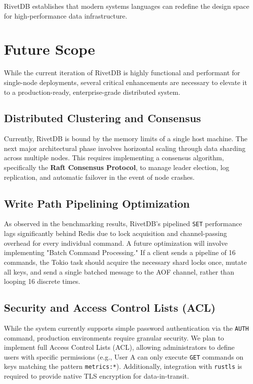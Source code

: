 RivetDB establishes that modern systems languages can redefine the design space for high-performance data infrastructure.

\section{Future Scope}

While the current iteration of RivetDB is highly functional and performant for single-node deployments, several critical enhancements are necessary to elevate it to a production-ready, enterprise-grade distributed system.

\subsection{Distributed Clustering and Consensus}
Currently, RivetDB is bound by the memory limits of a single host machine. The next major architectural phase involves horizontal scaling through data sharding across multiple nodes. This requires implementing a consensus algorithm, specifically the \textbf{Raft Consensus Protocol}, to manage leader election, log replication, and automatic failover in the event of node crashes.

\subsection{Write Path Pipelining Optimization}
As observed in the benchmarking results, RivetDB's pipelined \texttt{SET} performance lags significantly behind Redis due to lock acquisition and channel-passing overhead for every individual command. A future optimization will involve implementing "Batch Command Processing." If a client sends a pipeline of 16 commands, the Tokio task should acquire the necessary shard locks once, mutate all keys, and send a single batched message to the AOF channel, rather than looping 16 discrete times.

\subsection{Security and Access Control Lists (ACL)}
While the system currently supports simple password authentication via the \texttt{AUTH} command, production environments require granular security. We plan to implement full Access Control Lists (ACL), allowing administrators to define users with specific permissions (e.g., User A can only execute \texttt{GET} commands on keys matching the pattern \texttt{metrics:*}). Additionally, integration with \texttt{rustls} is required to provide native TLS encryption for data-in-transit.

